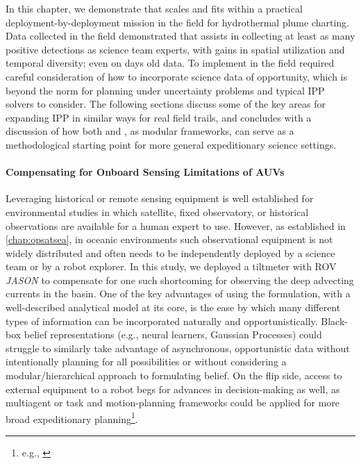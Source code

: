 In this chapter, we demonstrate that \PHORTEX scales and fits within a practical deployment-by-deployment mission in the field for hydrothermal plume charting. Data collected in the field demonstrated that \PHORTEX assists in collecting at least as many positive detections as science team experts, with gains in spatial utilization and temporal diversity; even on days old data. To implement \PHORTEX in the field required careful consideration of how to incorporate science data of opportunity, which is beyond the norm for planning under uncertainty problems and typical IPP solvers to consider. The following sections discuss some of the key areas for expanding IPP in similar ways for real field trails, and concludes with a discussion of how both \PHORTEX and \PHUMES, as modular frameworks, can serve as a methodological starting point for more general expeditionary science settings.

\paragraph{Compensating for Onboard Sensing Limitations of AUVs}
Leveraging historical or remote sensing equipment is well established for environmental studies in which satellite, fixed observatory, or historical observations are available for a human expert to use. However, as established in \cref{chap:opsatsea}, in oceanic environments such observational equipment is not widely distributed and often needs to be independently deployed by a science team or by a robot explorer. In this study, we deployed a tiltmeter with ROV \emph{JASON} to compensate for one such shortcoming for observing the deep advecting currents in the basin. One of the key advantages of using the \PHUMES formulation, with a well-described analytical model at its core, is the ease by which many different types of information can be incorporated naturally and opportunistically. Black-box belief representations (e.g., neural learners, Gaussian Processes) could struggle to similarly take advantage of asynchronous, opportunistic data without intentionally planning for all possibilities or without considering a modular/hierarchical approach to formulating belief. On the flip side, access to external equipment to a robot begs for advances in decision-making as well, as multiagent\autocite{salam2019adaptive,li2014multi,luo2018adaptive,ouyang2014multi} or task and motion-planning frameworks could be applied for more broad expeditionary planning\footnote{e.g., \autocite{timmons2019automated}}. 

